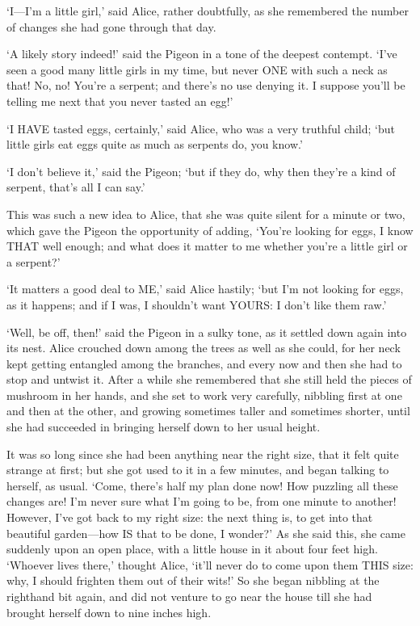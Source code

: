 \documentclass[12pt]{article}
\begin{document}
\begin{Parallel}[p]{}{}
{‘I—I’m a little girl,’ said Alice, rather doubtfully, as she remembered the number of changes she had gone through that day.

‘A likely story indeed!’ said the Pigeon in a tone of the deepest contempt. ‘I’ve seen a good many little girls in my time, but never ONE with such a neck as that! No, no! You’re a serpent; and there’s no use denying it. I suppose you’ll be telling me next that you never tasted an egg!’

‘I HAVE tasted eggs, certainly,’ said Alice, who was a very truthful child; ‘but little girls eat eggs quite as much as serpents do, you know.’

‘I don’t believe it,’ said the Pigeon; ‘but if they do, why then they’re a kind of serpent, that’s all I can say.’

This was such a new idea to Alice, that she was quite silent for a minute or two, which gave the Pigeon the opportunity of adding, ‘You’re looking for eggs, I know THAT well enough; and what does it matter to me whether you’re a little girl or a serpent?’

‘It matters a good deal to ME,’ said Alice hastily; ‘but I’m not looking for eggs, as it happens; and if I was, I shouldn’t want YOURS: I don’t like them raw.’

‘Well, be off, then!’ said the Pigeon in a sulky tone, as it settled down again into its nest. Alice crouched down among the trees as well as she could, for her neck kept getting entangled among the branches, and every now and then she had to stop and untwist it. After a while she remembered that she still held the pieces of mushroom in her hands, and she set to work very carefully, nibbling first at one and then at the other, and growing sometimes taller and sometimes shorter, until she had succeeded in bringing herself down to her usual height.

It was so long since she had been anything near the right size, that it felt quite strange at first; but she got used to it in a few minutes, and began talking to herself, as usual. ‘Come, there’s half my plan done now! How puzzling all these changes are! I’m never sure what I’m going to be, from one minute to another! However, I’ve got back to my right size: the next thing is, to get into that beautiful garden—how IS that to be done, I wonder?’ As she said this, she came suddenly upon an open place, with a little house in it about four feet high. ‘Whoever lives there,’ thought Alice, ‘it’ll never do to come upon them THIS size: why, I should frighten them out of their wits!’ So she began nibbling at the righthand bit again, and did not venture to go near the house till she had brought herself down to nine inches high.




}
\end{Parallel}
\end{document}
